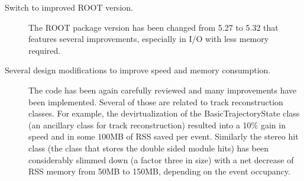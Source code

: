 \begin{description}
\item[Switch to improved ROOT version.] The ROOT package version has
  been changed from 5.27 to 5.32 that features several improvements,
  especially in I/O with less memory required. 
\item[Several design modifications to improve speed and memory
  consumption.] The code has been again carefully reviewed and many
  improvements have been implemented. Several of those are related to
  track reconstruction classes. For example, the devirtualization of
  the BasicTrajectoryState class (an ancillary class for track
  reconstruction) resulted into a 10\% gain in speed and in some
  $100$MB of RSS saved per event. Similarly the stereo hit class (the
  class that stores the double sided module hits) has been
  considerably slimmed down (a factor three in size) with a net decrease of
  RSS memory from 50MB to 150MB, depending on the event occupancy.
\end{description}

